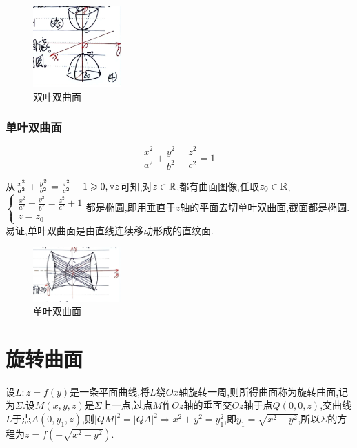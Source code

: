 \begin{figure}[htbp]
    \centering
    \includegraphics[width=0.3\textwidth]{figure/4-7.png}
    \caption{双叶双曲面}
    \label{fig:双叶双曲面}
\end{figure}

\subsubsection*{单叶双曲面}

$$
\frac{x^2}{a^2} + \frac{y^2}{b^2} - \frac{z^2}{c^2} = 1
$$

从$\frac{x^2}{a^2} + \frac{y^2}{b^2} = \frac{z^2}{c^2} + 1 \geqslant 0, \forall z$可知,对$z \in \mathbb{R}$,都有曲面图像,任取$z_0 \in \mathbb{R}$,$\begin{cases}
    \frac{x^2}{a^2} + \frac{y^2}{b^2} = \frac{z^2}{c^2} + 1\\
    z = z_0
\end{cases}$都是椭圆,即用垂直于$z$轴的平面去切单叶双曲面,截面都是椭圆.易证,单叶双曲面是由直线连续移动形成的直纹面.

\begin{figure}[htbp]
    \centering
    \includegraphics[width=0.3\textwidth]{figure/4-8.png}
    \caption{单叶双曲面}
    \label{fig:单叶双曲面}
\end{figure}

\section{旋转曲面}

设$L:z = f(y)$是一条平面曲线,将$L$绕$Ox$轴旋转一周,则所得曲面称为旋转曲面,记为$\Sigma$.设$M(x,y,z)$是$\Sigma$上一点,过点$M$作$Oz$轴的垂面交$Oz$轴于点$Q(0,0,z)$,交曲线$L$于点$A(0,y_1,z)$,则$| QM|^2 = | QA|^2 \Rightarrow x^2 + y^2 = y_1^2$,即$y_1 = \sqrt{x^2 + y^2}$,所以$\Sigma$的方程为$z = f(\pm \sqrt{x^2 + y^2})$.

